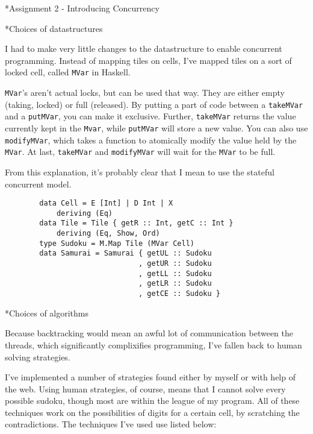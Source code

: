 \documentclass[a4paper,12pt]{article}
\begin{document}
\begin{section}*{Assignment 2 - Introducing Concurrency}


    \begin{subsection}*{Choices of datastructures}

        I had to make very little changes to the datastructure to enable
        concurrent programming. Instead of mapping tiles on cells, I've mapped
        tiles on a sort of locked cell, called \texttt{MVar} in Haskell.

        \texttt{MVar}'s aren't actual locks, but can be used that way. They are
        either empty (taking, locked) or full (released). By putting a part of
        code between a \texttt{takeMVar} and a \texttt{putMVar}, you can make it
        exclusive. Further, \texttt{takeMVar} returns the value currently kept
        in the \texttt{Mvar}, while \texttt{putMVar} will store a new value. You
        can also use \texttt{modifyMVar}, which takes a function to atomically
        modify the value held by the \texttt{MVar}. At last, \texttt{takeMVar}
        and \texttt{modifyMVar} will wait for the \texttt{MVar} to be full.

        From this explanation, it's probably clear that I mean to use the
        stateful concurrent model.

        \begin{lstlisting}
        data Cell = E [Int] | D Int | X
            deriving (Eq)
        data Tile = Tile { getR :: Int, getC :: Int }
            deriving (Eq, Show, Ord)
        type Sudoku = M.Map Tile (MVar Cell)
        data Samurai = Samurai { getUL :: Sudoku
                               , getUR :: Sudoku
                               , getLL :: Sudoku
                               , getLR :: Sudoku
                               , getCE :: Sudoku }
        \end{lstlisting}

    \end{subsection}


    \begin{subsection}*{Choices of algorithms}

        Because backtracking would mean an awful lot of communication between
        the threads, which significantly complixifies programming, I've fallen
        back to human solving strategies.

        I've implemented a number of strategies found either by myself or with
        help of the web. Using human strategies, of course, means that I cannot
        solve every possible sudoku, though most are within the league of my
        program. All of these techniques work on the possibilities of digits for
        a certain cell, by scratching the contradictions. The techniques I've
        used use listed below:


\end{subsection}
\end{section}
\end{document}

